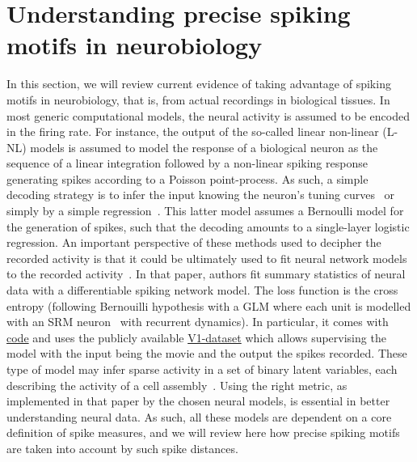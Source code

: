 \documentclass[brainsci, %
               review,submit,pdftex,moreauthors
               ]{Definitions/mdpi}
\begin{document}
\section{Understanding precise spiking motifs in neurobiology}
In this section, we will review current evidence of taking advantage of spiking motifs in neurobiology, that is, from actual recordings in biological tissues. In most generic computational models, the neural activity is assumed to be encoded in the firing rate. For instance, the output of the so-called linear non-linear (L-NL) models is assumed to model the response of a biological neuron as the sequence of a linear integration followed by a non-linear spiking response generating spikes according to a Poisson point-process. As such, a simple decoding strategy is to infer the input knowing the neuron's tuning curves~\citep{jazayeri_optimal_2006} or simply by a simple regression~\citep{berens_fast_2012}. This latter model assumes a Bernoulli model for the generation of spikes, such that the decoding amounts to a single-layer logistic regression. An important perspective of these methods used to decipher the recorded activity is that it could be ultimately used to fit neural network models to the recorded activity~\citep{bellec_fitting_2021}. In that paper, authors fit summary statistics of neural data with a differentiable spiking network model. The loss function is the cross entropy (following Bernouilli hypothesis with a GLM where each unit is modelled with an SRM neuron~\citep{gerstner_time_1995} with recurrent dynamics). In particular, it comes with \href{https://github.com/EPFL-LCN/pub-bellec-wang-2021-sample-and-measure}{code} and uses the publicly available \href{http://crcns.org/data-sets/vc/pvc-11}{V1-dataset} which allows supervising the model with the input being the movie and the output the spikes recorded. These type of model may infer sparse activity in a set of binary latent variables, each describing the activity of a cell assembly~\citep{warner_probabilistic_2022}.
Using the right metric, as implemented in that paper by the chosen neural models, is essential in better understanding neural data. As such, all these models are dependent on a core definition of spike measures, and we will review here how precise spiking motifs are taken into account by such spike distances.
%
\end{document}
